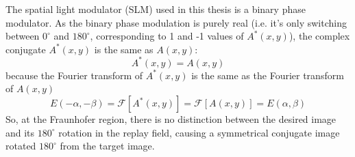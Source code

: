 The spatial light modulator (SLM) used in this thesis is a binary phase modulator. As the binary phase modulation is purely real (i.e. it's only switching between $0^\circ$ and $180^\circ$, corresponding to 1 and -1 values of $A^*(x,y)$), the complex conjugate $A^*(x,y)$ is the same as $A(x,y)$:
\begin{equation} \label{eq:AequalsAstar}
  A^*(x,y) = A(x,y)
\end{equation}
because the Fourier transform of $A^*(x,y)$ is the same as the Fourier transform of $A(x,y)$
\begin{equation} \label{eq:AAstar}
  E(-\alpha, -\beta)=\mathcal{F}[A^*(x,y)]=\mathcal{F}[A(x,y)]=E(\alpha, \beta)
\end{equation}
So, at the Fraunhofer region, there is no distinction between the desired image and its $180^\circ$ rotation in the replay field, causing a symmetrical conjugate image rotated $180^\circ$ from the target image.

